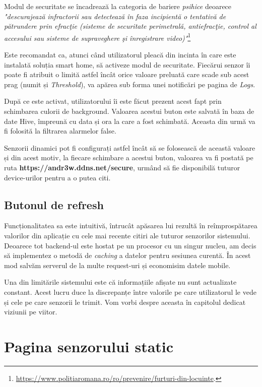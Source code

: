 Modul de securitate se încadrează la categoria de bariere \emph{psihice} deoarece \emph{"descurajează infractorii sau detectează în faza incipientă o tentativă de pătrundere prin efracţie (sisteme de securitate perimetrală, antiefracţie, control al accesului sau sisteme de supraveghere şi înregistrare video)"}\footnote{\url{https://www.politiaromana.ro/ro/prevenire/furturi-din-locuinte}.}

Este recomandat ca, atunci când utilizatorul pleacă din incinta în care este instalată soluția smart home, să activeze modul de securitate. Fiecărui senzor îi poate fi atribuit o limită astfel încât orice valoare preluată  care scade sub acest prag (numit și \emph{Threshold}), va apărea sub forma unei notificări pe pagina de \emph{Logs}.

După ce este activat, utilizatorului îi este făcut prezent acest fapt prin schimbarea culorii de background. Valoarea acestui buton este salvată în baza de date Hive, împreună cu data și ora la care a fost schimbată. Aceasta din urmă va fi folosită la filtrarea alarmelor false.

Senzorii dinamici pot fi configurați astfel încât să se folosească de această valoare și din acest motiv, la fiecare schimbare a acestui buton, valoarea va fi postată pe ruta \textbf{https://andr3w.ddns.net/secure}, urmând să fie disponibilă tuturor device-urilor pentru a o putea citi.

\subsection{Butonul de refresh}

Funcționalitatea sa este intuitivă, întrucât apăsarea lui rezultă în reîmprospătarea valorilor din aplicație cu cele mai recente citiri ale tuturor senzorilor sistemului. Deoarece tot backend-ul este hostat pe un procesor cu un singur nucleu, am decis să implementez o metodă de \emph{caching} a datelor pentru sesiunea curentă. În acest mod salvăm serverul de la multe request-uri și economisim datele mobile.

Una din limitările sistemului este că informațiile afișate nu sunt actualizate constant. Acest lucru duce la discrepanțe între valorile pe care utilizatorul le vede și cele pe care senzorii le trimit. Vom vorbi despre aceasta în capitolul dedicat viziunii pe viitor.

\break

\section{Pagina senzorului static}
\label{section:static}

